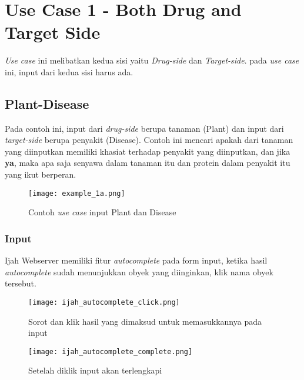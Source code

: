 \chapter{Use Case 1 - Both Drug and Target Side} \label{Use Case}

\emph{Use case} ini melibatkan kedua sisi yaitu \emph{Drug-side} dan \emph{Target-side}. pada \emph{use case} ini, input dari kedua sisi harus ada.

\section{Plant-Disease}

Pada contoh ini, input dari \emph{drug-side} berupa tanaman (Plant) dan input dari \emph{target-side} berupa penyakit (Disease). Contoh ini mencari apakah dari tanaman yang diinputkan memiliki khasiat terhadap penyakit yang diinputkan, dan jika \textbf{ya}, maka apa saja senyawa dalam tanaman itu dan protein dalam penyakit itu yang ikut berperan.

\begin{figure}[H]
	\centering
	\texttt{[image: example\_1a.png]}
	\caption{Contoh \emph{use case} input Plant dan Disease}
	\label{fig:example_1a}
\end{figure}

\subsection{Input}
Ijah Webserver memiliki fitur \emph{autocomplete} pada form input, ketika hasil \emph{autocomplete} sudah menunjukkan obyek yang diinginkan, klik nama obyek tersebut.

\begin{figure}[H]
	\centering
	\texttt{[image: ijah\_autocomplete\_click.png]}
	\caption{Sorot dan klik hasil yang dimaksud untuk memasukkannya pada input}
	\label{fig:ijah_autocomplete_click}
\end{figure}

\begin{figure}[H]
	\centering
	\texttt{[image: ijah\_autocomplete\_complete.png]}
	\caption{Setelah diklik input akan terlengkapi}
	\label{fig:ijah_autocomplete_complete}
\end{figure}

